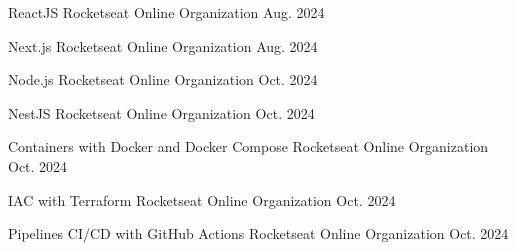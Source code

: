 

\begin{cvhonors}

  \cvhonor
    {ReactJS} %
    {Rocketseat} %
    {Online Organization} %
    {Aug. 2024} %

  \cvhonor
    {Next.js} %
    {Rocketseat} %
    {Online Organization} %
    {Aug. 2024} %

  \cvhonor
    {Node.js} %
    {Rocketseat} %
    {Online Organization} %
    {Oct. 2024} %

  \cvhonor
    {NestJS} %
    {Rocketseat} %
    {Online Organization} %
    {Oct. 2024} %

  \cvhonor
    {Containers with Docker and Docker Compose} %
    {Rocketseat} %
    {Online Organization} %
    {Oct. 2024} %

  \cvhonor
    {IAC with Terraform} %
    {Rocketseat} %
    {Online Organization} %
    {Oct. 2024} %

  \cvhonor
    {Pipelines CI/CD with GitHub Actions} %
    {Rocketseat} %
    {Online Organization} %
    {Oct. 2024} %

\end{cvhonors}
